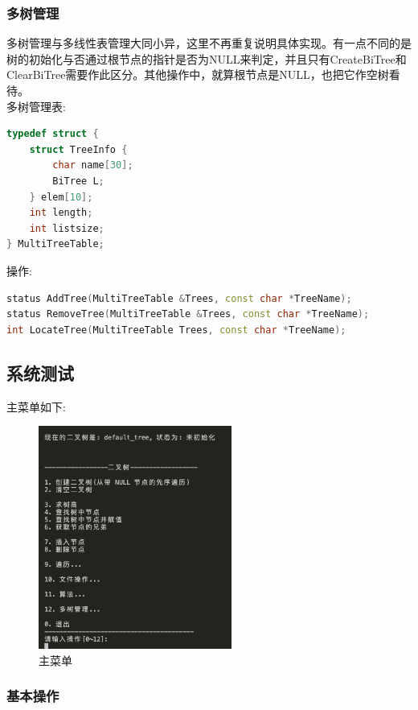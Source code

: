 \documentclass[supercite]{Experimental_Report}
\theoremstyle{definition}
\begin{document}
\subsubsection{多树管理}
\noindent
多树管理与多线性表管理大同小异，这里不再重复说明具体实现。有一点不同的是树的初始化与否通过根节点的指针是否为NULL来判定，并且只有CreateBiTree和ClearBiTree需要作此区分。其他操作中，就算根节点是NULL，也把它作空树看待。 \\
多树管理表:
\begin{lstlisting}[language=C++, frame=single]
typedef struct {  
    struct TreeInfo {
        char name[30];
        BiTree L;
    } elem[10];
    int length;
    int listsize;
} MultiTreeTable;
\end{lstlisting}
操作:
\begin{lstlisting}[language=C++, frame=single]
status AddTree(MultiTreeTable &Trees, const char *TreeName);
status RemoveTree(MultiTreeTable &Trees, const char *TreeName);
int LocateTree(MultiTreeTable Trees, const char *TreeName);
\end{lstlisting}

\subsection{系统测试}

\noindent
主菜单如下:
\begin{figure}[htbp]
	\centering
	\includegraphics[width=2.5in]{binary_tree/menu.png}
	\caption{主菜单}
	\label{fig5-1}
\end{figure}

\subsubsection{基本操作}
\end{document}
